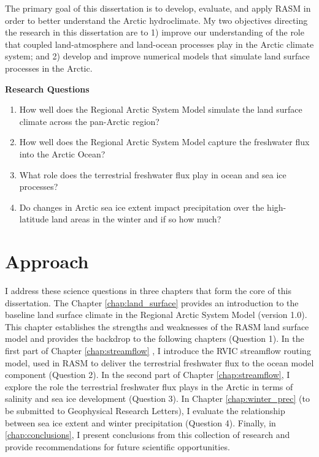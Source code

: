 The primary goal of this dissertation is to develop, evaluate, and apply RASM in order to better understand the Arctic hydroclimate.
My two objectives directing the research in this dissertation are to 1) improve our understanding of the role that coupled land-atmosphere and land-ocean processes play in the Arctic climate system; and 2) develop and improve numerical models that simulate land surface processes in the Arctic.

\begin{mdframed}
  {\bf Research Questions}
  \begin{enumerate}
    \item How well does the Regional Arctic System Model simulate the land surface climate across the pan-Arctic region?
    \item How well does the Regional Arctic System Model capture the freshwater flux into the Arctic Ocean?
    \item What role does the terrestrial freshwater flux play in ocean and sea ice processes?
    \item Do changes in Arctic sea ice extent impact precipitation over the high-latitude land areas in the winter and if so how much?
  \end{enumerate}
\end{mdframed}

\section{Approach}

I address these science questions in three chapters that form the core of this dissertation.
The Chapter \ref{chap:land_surface} \citep[published as ][]{Hamman_2016a} provides an introduction to the baseline land surface climate in the Regional Arctic System Model (version 1.0).
This chapter establishes the strengths and weaknesses of the RASM land surface model and provides the backdrop to the following chapters (Question 1).
In the first part of Chapter \ref{chap:streamflow} \citep{Hamman_2016b}, I introduce the RVIC streamflow routing model, used in RASM to deliver the terrestrial freshwater flux to the ocean model component (Question 2).
In the second part of Chapter \ref{chap:streamflow}, I explore the role the terrestrial freshwater flux plays in the Arctic in terms of salinity and sea ice development (Question 3).
In Chapter \ref{chap:winter_prec} (to be submitted to Geophysical Research Letters), I evaluate the relationship between sea ice extent and winter precipitation (Question 4).
Finally, in \ref{chap:conclusions}, I present conclusions from this collection of research and provide recommendations for future scientific opportunities.
